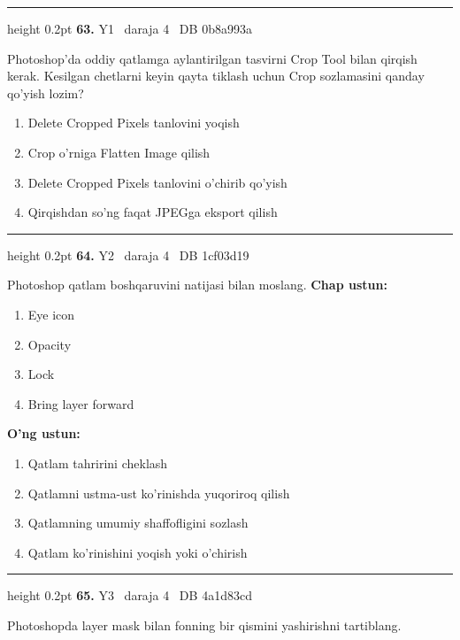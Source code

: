 \documentclass[10pt,a4paper,oneside]{article}
\begin{document}
\vspace{2mm}\hrule height 0.2pt \vspace{4mm}
\hypertarget{q63}{\textbf{\color{ink}63.}}  {\color{muted}\scriptsize Y1 \textbullet\ daraja 4 \textbullet\ DB 0b8a993a}
\par
Photoshop'da oddiy qatlamga aylantirilgan tasvirni Crop Tool bilan qirqish kerak. Kesilgan chetlarni keyin qayta tiklash uchun Crop sozlamasini qanday qo'yish lozim?
\begin{enumerate}[label=\Alph*),leftmargin=9mm]
\item Delete Cropped Pixels tanlovini yoqish
\item Crop o'rniga Flatten Image qilish
\item Delete Cropped Pixels tanlovini o'chirib qo'yish
\item Qirqishdan so'ng faqat JPEGga eksport qilish
\end{enumerate}
\vspace{2mm}\hrule height 0.2pt \vspace{4mm}
\hypertarget{q64}{\textbf{\color{ink}64.}}  {\color{muted}\scriptsize Y2 \textbullet\ daraja 4 \textbullet\ DB 1cf03d19}
\par
Photoshop qatlam boshqaruvini natijasi bilan moslang.
\textbf{\footnotesize Chap ustun:}
\begin{enumerate}[label=\arabic*),leftmargin=9mm]
\item Eye icon
\item Opacity
\item Lock
\item Bring layer forward
\end{enumerate}
\textbf{\footnotesize O'ng ustun:}
\begin{enumerate}[label=\Alph*),leftmargin=9mm]
\item Qatlam tahririni cheklash
\item Qatlamni ustma-ust ko'rinishda yuqoriroq qilish
\item Qatlamning umumiy shaffofligini sozlash
\item Qatlam ko'rinishini yoqish yoki o'chirish
\end{enumerate}
\vspace{2mm}\hrule height 0.2pt \vspace{4mm}
\hypertarget{q65}{\textbf{\color{ink}65.}}  {\color{muted}\scriptsize Y3 \textbullet\ daraja 4 \textbullet\ DB 4a1d83cd}
\par
Photoshopda layer mask bilan fonning bir qismini yashirishni tartiblang.
\end{document}
